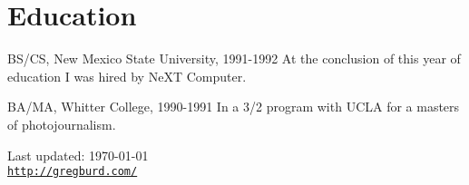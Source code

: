 \documentclass[letterpaper]{article}
\def\footerlink{http://gregburd.com/}
\renewenvironment{itemize}{
  \begin{list}{}{
    \setlength{\leftmargin}{1.5em}
  }
}{
  \end{list}
}
\begin{document}
\section*{Education}

\begin{itemize}
  \item BS/CS, New Mexico State University, 1991-1992
    At the conclusion of this year of education I was hired by NeXT Computer.

  \item BA/MA, Whitter College, 1990-1991
    In a 3/2 program with UCLA for a masters of photojournalism.
\end{itemize}

\bigskip

\begin{center}
  \begin{footnotesize}
    Last updated: \today \\
    \href{\footerlink}{\texttt{\footerlink}}
  \end{footnotesize}
\end{center}
\end{document}
